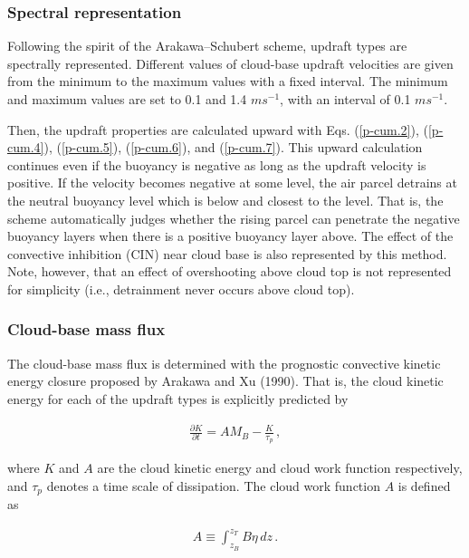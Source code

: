 \hypertarget{spectral-representation}{%
\subsubsection{Spectral representation}\label{spectral-representation}}

Following the spirit of the Arakawa--Schubert scheme, updraft types are
spectrally represented. Different values of cloud-base updraft
velocities are given from the minimum to the maximum values with a fixed
interval. The minimum and maximum values are set to 0.1 and 1.4
\(m s^{-1}\), with an interval of 0.1 \(m s^{-1}\).

Then, the updraft properties are calculated upward with Eqs.
(\ref{p-cum.2}), (\ref{p-cum.4}), (\ref{p-cum.5}),
(\ref{p-cum.6}), and (\ref{p-cum.7}). This upward calculation
continues even if the buoyancy is negative as long as the updraft
velocity is positive. If the velocity becomes negative at some level,
the air parcel detrains at the neutral buoyancy level which is below and
closest to the level. That is, the scheme automatically judges whether
the rising parcel can penetrate the negative buoyancy layers when there
is a positive buoyancy layer above. The effect of the convective
inhibition (CIN) near cloud base is also represented by this method.
Note, however, that an effect of overshooting above cloud top is not
represented for simplicity (i.e., detrainment never occurs above cloud
top).

\hypertarget{cloud-base-mass-flux}{%
\subsubsection{Cloud-base mass flux}\label{cloud-base-mass-flux}}

The cloud-base mass flux is determined with the prognostic convective
kinetic energy closure proposed by Arakawa and Xu (1990). That is, the
cloud kinetic energy for each of the updraft types is explicitly
predicted by

\begin{eqnarray}
 \frac{\partial K}{\partial t} = AM_B - \frac{K}{\tau_p}\,,  \label{p-cum.8}
\end{eqnarray}

where \(K\) and \(A\) are the cloud kinetic energy and cloud work
function respectively, and \(\tau_p\) denotes a time scale of
dissipation. The cloud work function \(A\) is defined as

\begin{eqnarray}
 A \equiv \int_{z_B}^{z_T} B \eta \,dz\,.
\end{eqnarray}

